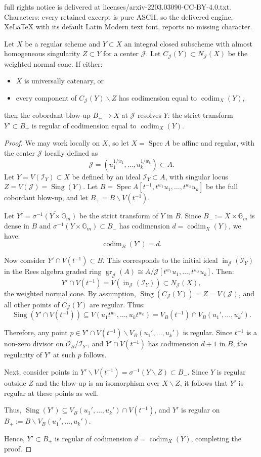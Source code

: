 \documentclass[10pt,a4paper]{amsart}
\newcommand{\Sing}{{\operatorname{Sing}}}
\newcommand{\Spec}{\operatorname{Spec}}
\newcommand{\cI}{{\mathcal I}}
\newcommand{\cJ}{{\mathcal J}}
\newcommand{\cO}{{\mathcal O}}
\newcommand{\codim}{\operatorname{codim}}
\newcommand{\gr}{{\operatorname{gr}}}
\newcommand{\inn}{\operatorname{in}}
\renewcommand{\setminus}{\smallsetminus}
\begin{document}
full rights notice is delivered at licenses/arxiv-2203.03090-CC-BY-4.0.txt. Characters: every retained excerpt is pure ASCII, so the delivered engine, XeLaTeX with its default Latin Modern text font, reports no missing character.
\begin{theorem} \label{Homoge1}
Let $X$ be a regular scheme and $Y \subset X$ an integral closed subscheme with almost homogeneous singularity $Z \subset Y$ for a center $\cJ$. Let $C_{\cJ}(Y) \subset N_{\cJ}(X)$ be the weighted normal cone. If either:
\begin{itemize}
  \item $X$ is universally catenary, or
  \item every component of $C_{\cJ}(Y) \setminus Z$ has codimension equal to $\codim_X(Y)$,
\end{itemize}
then the cobordant blow-up $B_+ \to X$ at $\cJ$ resolves $Y$: the strict transform $Y' \subset B_+$ is regular of codimension equal to $\codim_X(Y)$.
\end{theorem}

\begin{proof}
We may work locally on $X$, so let $X = \Spec A$ be affine and regular, with the center $\cJ$ locally defined as
\[
\cJ = (u_1^{1/w_1}, \ldots, u_k^{1/w_k}) \subset A.
\]
Let $Y = V(\cI_Y) \subset X$ be defined by an ideal $\cI_Y \subset A$, with singular locus $Z = V(\cJ) = \Sing(Y)$. Let $B = \Spec A[t^{-1}, t^{w_1}u_1, \ldots, t^{w_k}u_k]$ be the full cobordant blow-up, and let $B_+ = B \setminus V(t^{-1})$.

Let $Y' = \overline{\sigma^{-1}(Y \times \mathbb{G}_m)}$ be the strict transform of $Y$ in $B$. Since $B_- := X \times \mathbb{G}_m$ is dense in $B$ and $\sigma^{-1}(Y \times \mathbb{G}_m) \subset B_-$ has codimension $d = \codim_X(Y)$, we have:
\[
\codim_B(Y') = d.
\]

Now consider $Y' \cap V(t^{-1}) \subset B$. This corresponds to the initial ideal $\inn_{\cJ}(\cI_Y)$ in the Rees algebra graded ring $\gr_{\cJ}(A) \cong A / \cJ[t^{w_1}u_1, \ldots, t^{w_k}u_k]$. Then:
\[
Y' \cap V(t^{-1}) = V(\inn_{\cJ}(\cI_Y)) \subset N_{\cJ}(X),
\]
the weighted normal cone. By assumption, $\Sing(C_{\cJ}(Y)) = Z = V(\cJ)$, and all other points of $C_{\cJ}(Y)$ are regular. Thus:
\[
\Sing(Y' \cap V(t^{-1})) \subseteq V(u_1t^{w_1}, \ldots, u_kt^{w_k}) = V_B(t^{-1}) \cap V_B(u_1', \ldots, u_k').
\]

Therefore, any point $p \in Y' \cap V(t^{-1}) \setminus V_B(u_1', \ldots, u_k')$ is regular. Since $t^{-1}$ is a non-zero divisor on $\cO_B/\cI_{Y'}$, and $Y' \cap V(t^{-1})$ has codimension $d+1$ in $B$, the regularity of $Y'$ at such $p$ follows.

Next, consider points in $Y' \setminus V(t^{-1}) = \sigma^{-1}(Y \setminus Z) \subset B_-$. Since $Y$ is regular outside $Z$ and the blow-up is an isomorphism over $X \setminus Z$, it follows that $Y'$ is regular at these points as well.

Thus, $\Sing(Y') \subseteq V_B(u_1', \ldots, u_k') \cap V(t^{-1})$, and $Y'$ is regular on $B_+ := B \setminus V_B(u_1', \ldots, u_k')$.

Hence, $Y' \subset B_+$ is regular of codimension $d = \codim_X(Y)$, completing the proof.
\end{proof}
\end{document}
